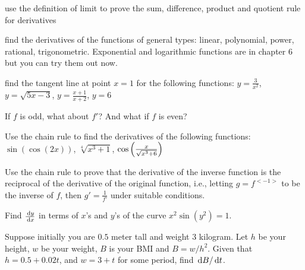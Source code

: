 \documentclass[Calculus 1 Recitation.tex]{subfiles}
\begin{document}
\begin{myleftlinebox}
	use the definition of limit to prove the sum, difference, product and quotient rule for derivatives
	\tcblower
	\vspace{3em}
\end{myleftlinebox}

\begin{myleftlinebox}
	find the derivatives of the functions of general types: linear, polynomial, power, rational, trigonometric. Exponential and logarithmic functions are in chapter 6 but you can try them out now.
	\tcblower
	\vspace{3em}
\end{myleftlinebox}

\begin{myleftlinebox}
	find the tangent line at point $x=1$ for the following functions: $y=\frac{3}{x^2}$, $y=\sqrt{5x-3}$, $y=\frac{x+1}{x+2}$, $y=6$
	\tcblower
	\vspace{3em}
\end{myleftlinebox}

\begin{myleftlinebox}
	If $f$ is odd, what about $f'$? And what if $f$ is even?
	\tcblower
	\vspace{2em}
\end{myleftlinebox}

\begin{myleftlinebox}
	Use the chain rule to find the derivatives of the following functions: $\sin(\cos(2x))$, $\sqrt[4]{x^3+1}$, $\cos\left( \frac{x}{\sqrt{x^3+6}} \right)$
	\tcblower
	\vspace{2em}
\end{myleftlinebox}

\begin{myleftlinebox}
	Use the chain rule to prove that the derivative of the inverse function is the reciprocal of the derivative of the original function, i.e., letting $g=f^{<-1>}$ to be the inverse of $f$, then $g'=\frac{1}{f'}$ under suitable conditions.
	\tcblower
	\vspace{2em}
\end{myleftlinebox}

\begin{myleftlinebox}
	Find $\frac{\,\mathrm{d} y}{\,\mathrm{d} x}$ in terms of $x$'s and $y$'s of the curve $x^2\sin(y^2)=1$.
	\tcblower
	\vspace{2em}
\end{myleftlinebox}

\begin{myleftlinebox}
	Suppose initially you are $0.5$ meter tall and weight $3$ kilogram. Let $h$ be your height, $w$ be your weight, $B$ is your BMI and $B=w/h^2$. Given that $h=0.5+0.02t$, and $w=3+t$ for some period, find $\,\mathrm{d} B/\,\mathrm{d} t$.
	\tcblower
	\vspace{2em}
\end{myleftlinebox}
\end{document}
